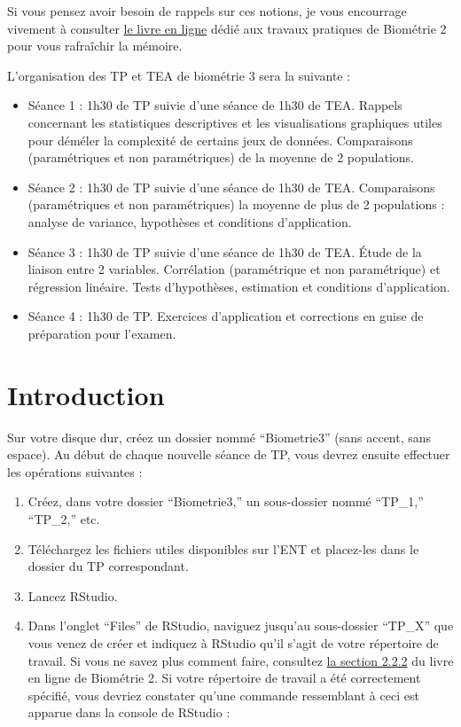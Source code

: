 \documentclass[
  a4paper,
]{article}
\providecommand{\tightlist}{%
  \setlength{\itemsep}{0pt}\setlength{\parskip}{0pt}}
\begin{document}
Si vous pensez avoir besoin de rappels sur ces notions, je vous encourrage vivement à consulter \href{https://besibo.github.io/Biometrie2/}{le livre en ligne} dédié aux travaux pratiques de Biométrie 2 pour vous rafraîchir la mémoire.

L'organisation des TP et TEA de biométrie 3 sera la suivante :

\begin{itemize}
\tightlist
\item
  Séance 1 : 1h30 de TP suivie d'une séance de 1h30 de TEA. Rappels concernant les statistiques descriptives et les visualisations graphiques utiles pour déméler la complexité de certains jeux de données. Comparaisons (paramétriques et non paramétriques) de la moyenne de 2 populations.
\item
  Séance 2 : 1h30 de TP suivie d'une séance de 1h30 de TEA. Comparaisons (paramétriques et non paramétriques) la moyenne de plus de 2 populations : analyse de variance, hypothèses et conditions d'application.
\item
  Séance 3 : 1h30 de TP suivie d'une séance de 1h30 de TEA. Étude de la liaison entre 2 variables. Corrélation (paramétrique et non paramétrique) et régression linéaire. Tests d'hypothèses, estimation et conditions d'application.
\item
  Séance 4 : 1h30 de TP. Exercices d'application et corrections en guise de préparation pour l'examen.
\end{itemize}

\hypertarget{intro}{%
\section{Introduction}\label{intro}}

Sur votre disque dur, créez un dossier nommé ``Biometrie3'' (sans accent, sans espace).
Au début de chaque nouvelle séance de TP, vous devrez ensuite effectuer les opérations suivantes :

\begin{enumerate}
\def\labelenumi{\arabic{enumi}.}
\tightlist
\item
  Créez, dans votre dossier ``Biometrie3,'' un sous-dossier nommé ``TP\_1,'' ``TP\_2,'' etc.
\item
  Téléchargez les fichiers utiles disponibles sur l'ENT et placez-les dans le dossier du TP correspondant.
\item
  Lancez RStudio.
\item
  Dans l'onglet ``Files'' de RStudio, naviguez jusqu'au sous-dossier ``TP\_X'' que vous venez de créer et indiquez à RStudio qu'il s'agit de votre répertoire de travail. Si vous ne savez plus comment faire, consultez \href{https://besibo.github.io/Biometrie2/bases.html\#le-repertoire-de-travail}{la section 2.2.2} du livre en ligne de Biométrie 2. Si votre répertoire de travail a été correctement spécifié, vous devriez constater qu'une commande ressemblant à ceci est apparue dans la console de RStudio :
\end{enumerate}
\end{document}
